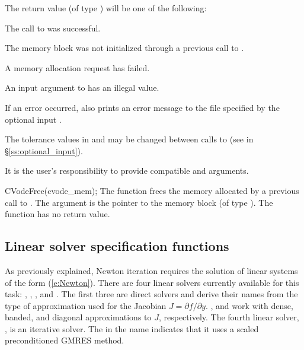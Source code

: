 {
  The return value  (of type ) will be one of the following:
  \begin{args}
  \item[\Id{CV\_SUCCESS}]
    The call to  was successful.
  \item[\Id{CV\_MEM\_NULL}] 
    The {\cvodes} memory block was not initialized through a previous call
    to .
  \item[\Id{CV\_MEM\_FAIL}] 
    A memory allocation request has failed.
  \item[\Id{CV\_ILL\_INPUT}] 
    An input argument to  has an illegal value.
  \end{args}
}
{
  If an error occurred,  also prints an error message to the
  file specified by the optional input .

  The tolerance values in  and  may be changed between
  calls to  (see  in \S\ref{ss:optional_input}).

  {\warn} It is the user's responsibility to provide compatible  and
   arguments.
}
{
  CVodeFree(cvode\_mem);
}
{
  The function  frees the memory allocated by
  a previous call to .
}
{
  The argument is the pointer to the {\cvodes} memory block (of type ).
}
{
  The function  has no return value.
}
{}
\subsection{Linear solver specification functions}\label{sss:lin_solv_init}

As previously explained, Newton iteration requires the solution of
linear systems of the form (\ref{e:Newton}).  There are four {\cvodes} linear
solvers currently available for this task: {\cvdense}, {\cvband}, {\cvdiag},
and {\cvspgmr}.  The first three are direct solvers and derive their names
from the type of approximation used for the Jacobian 
$J = \partial{f}/\partial{y}$.  {\cvdense}, {\cvband} and {\cvdiag} work with
dense, banded, and diagonal approximations to $J$, respectively.  The
fourth {\cvodes} linear solver, {\cvspgmr}, is an iterative solver.  The {\spgmr}
in the name indicates that it uses a scaled preconditioned
GMRES method.

